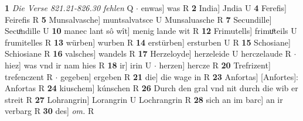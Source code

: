 \documentclass[8pt,a4paper,notitlepage]{article}
\begin{document}
\begin{table}[ht]
\begin{minipage}[t]{0.5\linewidth}
\textbf{1} \textit{Die Verse 821.21-826.30 fehlen} Q   $\cdot$ enwas] was R \textbf{2} India] Jndia U \textbf{4} Ferefis] Feirefis R \textbf{5} Munsalvasche] muntsalvatsce U Munsaluasche R \textbf{7} Secundille] Secuͦndille U \textbf{10} manec lant sô wît] menig lande wit R \textbf{12} Frimutells] frimuͦteils U frumitelles R \textbf{13} würben] wurben R \textbf{14} erstürben] ersturben U R \textbf{15} Schosiane] Schiosiane R \textbf{16} valsches] wandels R \textbf{17} Herzeloyde] herzeleide U herczelaude R  $\cdot$ hiez] was vnd ir nam hies R \textbf{18} ir] irin U  $\cdot$ herzen] hercze R \textbf{20} Trefrizent] trefenczent R  $\cdot$ gegeben] ergeben R \textbf{21} die] die wage in R \textbf{23} Anfortas] [Anfortes]: Anfortas R \textbf{24} kiuschem] kúnschen R \textbf{26} Durch den gral vnd nit durch die wib er streit R \textbf{27} Lohrangrin] Lorangrin U Lochrangrin R \textbf{28} sich an im barc] an ir verbarg R \textbf{30} des] \textit{om.} R \newline
\end{minipage}
\end{table}
\end{document}
